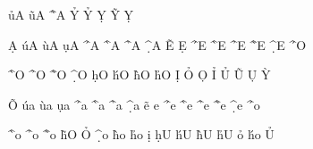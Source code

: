 
\startregime[viscii]

 {\h{uA}}
 {\~{uA}}
 {\~{^A}}
 {\h{Y}}
 {\h{Y}}
 {\d{Y}}
 {\~{Y}}
 {\d{Y}}

 {\d{A}}
 {\'{uA}}
 {\`{uA}}
 {\d{uA}}
 {\'{^A}}
 {\`{^A}}
 {\h{^A}}
 {\d{^A}}
 {\~{E}}
 {\d{E}}
 {\'{^E}}
 {\`{^E}}
 {\h{^E}}
 {\~{^E}}
 {\d{^E}}
 {\'{^O}}

 {\`{^O}}
 {\h{^O}}
 {\~{^O}}
 {\d{^O}}
 {\d{hO}}
 {\'{hO}}
 {\`{hO}}
 {\h{hO}}
 {\d{I}}
 {\h{O}}
 {\d{O}}
 {\h{I}}
 {\h{U}}
 {\~{U}}
 {\d{U}}
 {\`{Y}}

 {\~{O}}
 {\'{ua}}
 {\`{ua}}
 {\d{ua}}
 {\'{^a}}
 {\`{^a}}
 {\h{^a}}
 {\d{^a}}
 {\~{e}}
 {\d{ e}}
 {\'{^e}}
 {\`{^e}}
 {\h{^e}}
 {\~{^e}}
 {\d{^e}}
 {\'{^o}}

 {\`{^o}}
 {\h{^o}}
 {\~{^o}}
 {\~{hO}}
 {\h{O}}
 {\d{^o}}
 {\`{ho}}
 {\h{ho}}
 {\d{i}}
 {\d{hU}}
 {\'{hU}}
 {\`{hU}}
 {\h{hU}}
 {\h{o}}
 {\'{ho}}
 {\h{U}}

